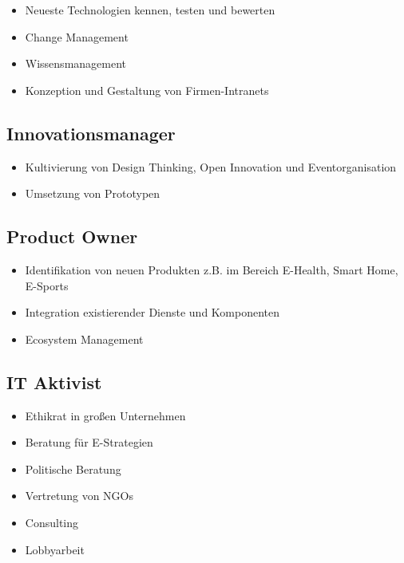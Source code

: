 \begin{itemize}
\tightlist
\item
  Neueste Technologien kennen, testen und bewerten
\item
  Change Management
\item
  Wissensmanagement
\item
  Konzeption und Gestaltung von Firmen-Intranets
\end{itemize}

\subsection*{Innovationsmanager\label{/mi-2017/modulbeschreibungen-master/schwerpunkt-soziotechnische-systeme}}\label{innovationsmanagerpathlabelmi-2017modulbeschreibungen-masterschwerpunkt-soziotechnische-systeme}

\begin{itemize}
\tightlist
\item
  Kultivierung von Design Thinking, Open Innovation und
  Eventorganisation
\item
  Umsetzung von Prototypen
\end{itemize}

\subsection*{Product
Owner\label{/mi-2017/modulbeschreibungen-master/schwerpunkt-soziotechnische-systeme}}\label{product-ownerpathlabelmi-2017modulbeschreibungen-masterschwerpunkt-soziotechnische-systeme}

\begin{itemize}
\tightlist
\item
  Identifikation von neuen Produkten z.B. im Bereich E-Health, Smart
  Home, E-Sports
\item
  Integration existierender Dienste und Komponenten
\item
  Ecosystem Management
\end{itemize}

\subsection*{IT
Aktivist\label{/mi-2017/modulbeschreibungen-master/schwerpunkt-soziotechnische-systeme}}\label{it-aktivistpathlabelmi-2017modulbeschreibungen-masterschwerpunkt-soziotechnische-systeme}

\begin{itemize}
\tightlist
\item
  Ethikrat in großen Unternehmen
\item
  Beratung für E-Strategien
\item
  Politische Beratung
\item
  Vertretung von NGOs
\item
  Consulting
\item
  Lobbyarbeit
\end{itemize}

